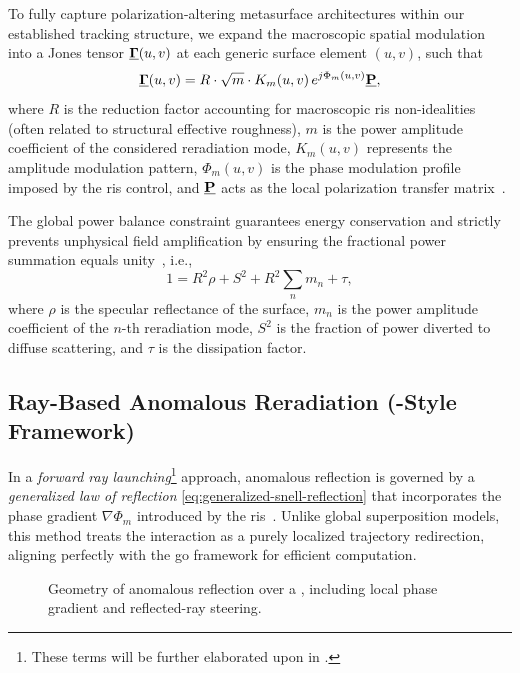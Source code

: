 To fully capture polarization-altering metasurface architectures within our established tracking structure, we expand the macroscopic spatial modulation into a Jones tensor $\underline{\mathbf{\Gamma}}(u,v)$ at each generic surface element $(u,v)$, such that
\begin{equation}
  \underline{\mathbf{\Gamma}}(u,v) = R \cdot \sqrt{m} \cdot K_m(u,v) \, e^{j\Phi_m(u,v)} \underline{\mathbf{P}},
\end{equation}
where $R$ is the reduction factor accounting for macroscopic \gls{ris} non-idealities (often related to structural effective roughness), $m$ is the power amplitude coefficient of the considered reradiation mode, $K_m(u,v)$ represents the amplitude modulation pattern, $\Phi_m(u,v)$ is the phase modulation profile imposed by the \gls{ris} control, and $\underline{\mathbf{P}}$ acts as the local polarization transfer matrix~.

The global power balance constraint guarantees energy conservation and strictly prevents unphysical field amplification by ensuring the fractional power summation equals unity~, i.e.,
\begin{equation}
  1 = R^2 \rho + S^2 + R^2 \sum_{n} m_n + \tau,
\end{equation}
where $\rho$ is the specular reflectance of the surface, $m_n$ is the power amplitude coefficient of the $n$-th reradiation mode, $S^2$ is the fraction of power diverted to diffuse scattering, and $\tau$ is the dissipation factor.

\subsection{Ray-Based Anomalous Reradiation (-Style Framework)}

In a \emph{forward ray launching}\footnote{These terms will be further elaborated upon in .} approach, anomalous reflection is governed by a \emph{generalized law of reflection} \eqref{eq:generalized-snell-reflection} that incorporates the phase gradient $\nabla \Phi_m$ introduced by the \gls{ris}~. Unlike global superposition models, this method treats the interaction as a purely localized trajectory redirection, aligning perfectly with the \gls{go} framework for efficient computation.

\begin{figure}
  \centering
  \caption{Geometry of anomalous reflection over a , including local phase gradient and reflected-ray steering.}
\end{figure}

